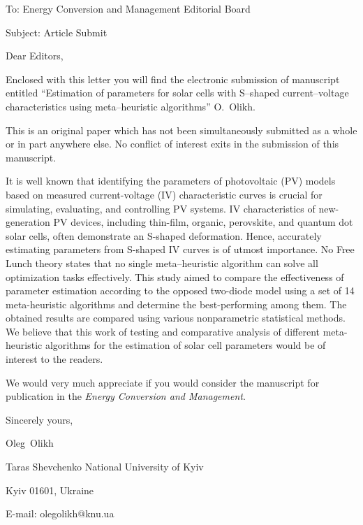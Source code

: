 \documentclass[preprint]{elsarticle}
\begin{document}
To:
Energy Conversion and Management Editorial Board


Subject:
Article Submit

\vspace{5mm}
Dear Editors,

\vspace{3mm}
Enclosed with this letter you will find the electronic submission of manuscript entitled
``Estimation of parameters for solar cells with S--shaped current--voltage characteristics using meta--heuristic algorithms'' O.~Olikh.



This is an original paper which has not been simultaneously submitted as a whole or in part anywhere else.
No conflict of interest exits in the submission of this manuscript.


It is well known that identifying the parameters of photovoltaic (PV) models based on measured current-voltage (IV) characteristic curves
is crucial for simulating, evaluating, and controlling PV systems.
IV characteristics of new-generation PV devices, 
including thin-film, organic, perovskite, and quantum dot solar cells, often demonstrate an S-shaped deformation.
Hence, accurately estimating parameters from S-shaped IV curves is of utmost importance.
No Free Lunch theory states that no single meta--heuristic algorithm can solve all optimization tasks effectively.
This study aimed to compare the effectiveness of parameter estimation according to the opposed two-diode model 
using a set of 14 meta-heuristic algorithms and determine the best-performing among them.
The obtained results are compared using various nonparametric statistical methods.
We believe that this work of testing and comparative analysis of different meta-heuristic algorithms for the estimation of solar cell parameters
would be of interest to the readers.


We would  very much appreciate if you would consider the manuscript for publication in the \emph{Energy Conversion and Management}.

\vspace{3mm}

Sincerely yours,

Oleg~Olikh


Taras Shevchenko National University of Kyiv


Kyiv 01601, Ukraine

E-mail: olegolikh@knu.ua


\end{document}
